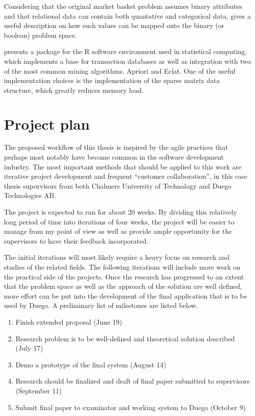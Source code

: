 \documentclass[a4paper]{article}
\begin{document}
Considering that the original market basket problem assumes binary attributes and that relational data can contain both
quantative and categorical data, \citep{Srikant1996} gives a useful description on how such values can be mapped onto the
binary (or boolean) problem space.

\citet{Hahsler2007} presents a package for the R software environment used in statistical computing, which implements a base
for transaction databases as well as integration with two of the most common mining algorithms, Apriori and Eclat. One of the
useful implementation choices is the implementation of the sparse matrix data structure, which greatly reduces memory load.

\section{Project plan}
The proposed workflow of this thesis is inspired by the agile practices that perhaps most notably have become common in the
software development industry. The most important methods that should be applied to this work are iterative project development
and frequent ``customer collaboration'', in this case thesis suporvisors from both Chalmers University of Technology and Duego
Technologies AB.

The project is expected to run for about 20 weeks. By dividing this relatively long period of time into iterations of four weeks,
the project will be easier to manage from my point of view as well as provide ample opportunity for the supervisors to have their
feedback incorporated.

The initial iterations will most likely require a heavy focus on research and studies of the related fields. The following
iterations will include more work on the practical side of the projects. Once the research has progressed to an extent that the
problem space as well as the approach of the solution are well defined, more effort can be put into the development of the final
application that is to be used by Duego. A preliminary list of milestones are listed below.

\begin{enumerate}
	\item Finish extended proposal (June 19)
	\item Research problem is to be well-defined and theoretical solution described (July 17)
	\item Demo a prototype of the final system (August 14)
	\item Research should be finalized and draft of final paper submitted to supervisors (September 11)
	\item Submit final paper to examinator and working system to Duego (October 9)
\end{enumerate}
\end{document}
